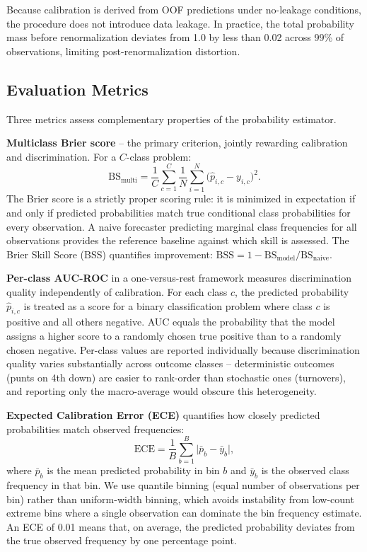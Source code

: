 \documentclass[12pt,a4paper]{article}
\begin{document}
Because calibration is derived from OOF predictions under no-leakage conditions, the procedure does not introduce data leakage. In practice, the total probability mass before renormalization deviates from 1.0 by less than 0.02 across 99\% of observations, limiting post-renormalization distortion.

\subsection{Evaluation Metrics}

Three metrics assess complementary properties of the probability estimator.

\textbf{Multiclass Brier score} -- the primary criterion, jointly rewarding calibration and discrimination. For a $C$-class problem:
\begin{equation}
  \text{BS}_{\text{multi}} = \frac{1}{C} \sum_{c=1}^{C}
    \frac{1}{N} \sum_{i=1}^{N}
    \bigl(\hat{p}_{i,c} - y_{i,c}\bigr)^2.
\end{equation}
The Brier score is a strictly proper scoring rule: it is minimized in expectation if and only if predicted probabilities match true conditional class probabilities for every observation. A naive forecaster predicting marginal class frequencies for all observations provides the reference baseline against which skill is assessed. The Brier Skill Score (BSS) quantifies improvement: $\text{BSS} = 1 - \text{BS}_{\text{model}} / \text{BS}_{\text{naive}}$.

\textbf{Per-class AUC-ROC} in a one-versus-rest framework measures discrimination quality independently of calibration. For each class $c$, the predicted probability $\hat{p}_{i,c}$ is treated as a score for a binary classification problem where class $c$ is positive and all others negative. AUC equals the probability that the model assigns a higher score to a randomly chosen true positive than to a randomly chosen negative. Per-class values are reported individually because discrimination quality varies substantially across outcome classes -- deterministic outcomes (punts on 4th down) are easier to rank-order than stochastic ones (turnovers), and reporting only the macro-average would obscure this heterogeneity.

\textbf{Expected Calibration Error (ECE)} quantifies how closely predicted probabilities match observed frequencies:
\begin{equation}
  \text{ECE} = \frac{1}{B} \sum_{b=1}^{B} \bigl| \bar{p}_b - \bar{y}_b \bigr|,
\end{equation}
where $\bar{p}_b$ is the mean predicted probability in bin $b$ and $\bar{y}_b$ is the observed class frequency in that bin. We use quantile binning (equal number of observations per bin) rather than uniform-width binning, which avoids instability from low-count extreme bins where a single observation can dominate the bin frequency estimate. An ECE of 0.01 means that, on average, the predicted probability deviates from the true observed frequency by one percentage point.
\end{document}
